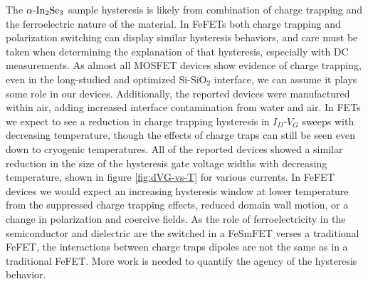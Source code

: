 The $\textrm{\ensuremath{\alpha}-In}_{2}\textrm{Se}_{3}$ sample hysteresis
is likely from combination of charge trapping and the ferroelectric
nature of the material. In FeFETs both charge trapping and polarization
switching can display similar hysteresis behaviors, and care must
be taken when determining the explanation of that hysteresis\citep{kokil2012techniques,osullivan2020defectprofiling,jung2020impactof,yurchuk2016chargetrapping},
especially with DC measurements. As almost all MOSFET devices show
evidence of charge trapping, even in the long-studied and optimized
Si-$\mathrm{SiO_{2}}$ interface, we can assume it plays some role
in our devices. Additionally, the reported devices were manufactured
within air, adding increased interface contamination from water and
air\citep{datye2018reduction,bartolomeo2017hysteresis,kim2018analysis}.
In FETs we expect to see a reduction in charge trapping hysteresis
in $I_{D}$-$V_{G}$ sweeps with decreasing temperature\citep{guo2015chargetrapping,datye2018reduction,kim2018analysis,park2021interface,bartolomeo2017hysteresis},
though the effects of charge traps can still be seen even down to
cryogenic temperatures\citep{powell1983chargetrapping,liu2021cryogenic,beckers2020physical,park2021interface,beckers2018cryogenic}.
All of the reported devices showed a similar reduction in the size
of the hysteresis gate voltage widths with decreasing temperature,
shown in figure \ref{fig:dVG-vs-T} for various currents. In FeFET
devices we would expect an increasing hysteresis window at lower temperature
from the suppressed charge trapping effects\citep{wang2020cryogenic,ni2018critical,ali2020astudy},
reduced domain wall motion\citep{tan2020hotelectrons}, or a change
in polarization and coercive fields\citep{ali2020astudy}. As the
role of ferroelectricity in the semiconductor and dielectric are the
switched in a FeSmFET verses a traditional FeFET, the interactions
between charge traps dipoles are not the same as in a traditional
FeFET. More work is needed to quantify the agency of the hysteresis
behavior.

